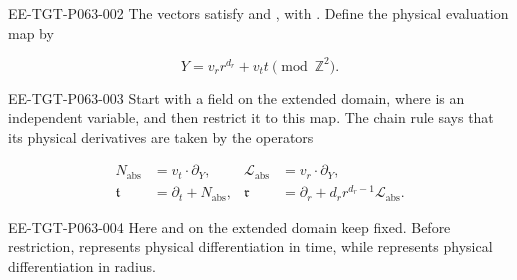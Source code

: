 \begin{EESegment}{EE-TGT-P063-002}
The vectors satisfy  and , with . Define the physical evaluation map by
\end{EESegment}
\begin{equation}
 Y=v_rr^{d_r}+v_tt\pmod{\mathbb Z^2}.
 \tag{6.3}\label{eq:6.3}
\end{equation}
\begin{EESegment}{EE-TGT-P063-003}
Start with a field on the extended domain, where  is an independent variable, and then restrict it to this map. The chain rule says that its physical derivatives are taken by the operators
\end{EESegment}
\begin{equation}
\begin{aligned}
 N_{\mathrm{abs}}&=v_t\mathbin\cdot\partial_Y,
 &\mathcal L_{\mathrm{abs}}&=v_r\mathbin\cdot\partial_Y,\\
 \mathfrak t&=\partial_t+N_{\mathrm{abs}},
 &\mathfrak r&=\partial_r+d_rr^{d_r-1}\mathcal L_{\mathrm{abs}}.
\end{aligned}
\tag{6.4}\label{eq:6.4}
\end{equation}
\begin{EESegment}{EE-TGT-P063-004}
Here  and  on the extended domain keep  fixed. Before restriction,  represents physical differentiation in time, while  represents physical differentiation in radius.
\end{EESegment}

